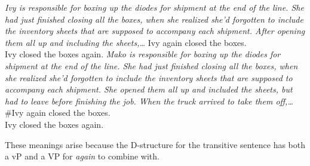 \begin{exe}
	\raggedright
	\sn \emph{Ivy is responsible for boxing up the diodes for shipment at the end of the line. She had just finished closing all the boxes, when she realized she'd forgotten to include the inventory sheets that are supposed to accompany each shipment. After opening them all up and including the sheets,\ldots}
	\ex \label{ex5:repivy1} Ivy again closed the boxes.\\ Ivy closed the boxes again.
	\sn \emph{Mako is responsible for boxing up the diodes for shipment at the end of the line. She had just finished closing all the boxes, when she realized she'd forgotten to include the inventory sheets that are supposed to accompany each shipment. She opened them all up and included the sheets, but had to leave before finishing the job. When the truck arrived to take them off,\ldots}
	\ex \label{ex5:repivy2} \#Ivy again closed the boxes.\\ \hspace*{5.5pt}Ivy closed the boxes again.
\end{exe}
These meanings arise because the D-structure for the transitive sentence has both a vP and a VP for \emph{again} to combine with. 

